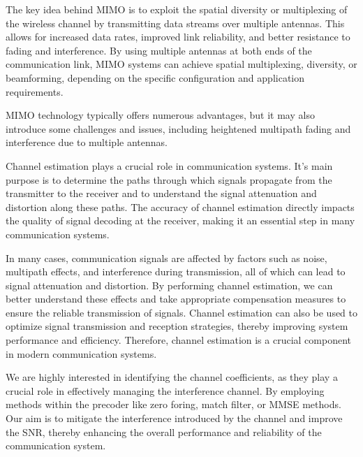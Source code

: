 \documentclass[a4paper, onecolumn, 11pt]{IEEEtran}
\begin{document}
        The key idea behind MIMO is to exploit the spatial diversity or multiplexing of the wireless channel by transmitting data streams over multiple antennas. 
        This allows for increased data rates, improved link reliability, and better resistance to fading and interference. By using multiple antennas at both ends 
        of the communication link, MIMO systems can achieve spatial multiplexing, diversity, or beamforming, depending on the specific configuration and application 
        requirements.

        MIMO technology typically offers numerous advantages, but it may also introduce some challenges and issues, including heightened multipath fading and 
        interference due to multiple antennas.

        Channel estimation plays a crucial role in communication systems. It's main purpose is to determine the paths through which signals propagate from the transmitter 
        to the receiver and to understand the signal attenuation and distortion along these paths. The accuracy of channel estimation directly impacts the quality of 
        signal decoding at the receiver, making it an essential step in many communication systems.

        In many cases, communication signals are affected by factors such as noise, multipath effects, and interference during transmission, all of which can lead to 
        signal attenuation and distortion. By performing channel estimation, we can better understand these effects and take appropriate compensation measures to ensure 
        the reliable transmission of signals. Channel estimation can also be used to optimize signal transmission and reception strategies, thereby improving system 
        performance and efficiency. Therefore, channel estimation is a crucial component in modern communication systems.
        
        We are highly interested in identifying the channel coefficients, as they play a crucial role in effectively managing the interference channel. By employing 
        methods within the precoder like zero foring, match filter, or MMSE methods.
        Our aim is to mitigate the interference introduced by the channel and improve the SNR, thereby enhancing the overall performance and 
        reliability of the communication system.\\
\end{document}
